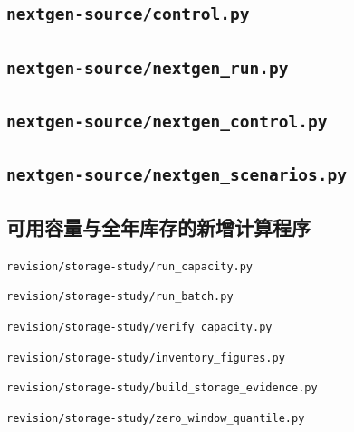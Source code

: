 \subsection*{\texttt{nextgen-source/control.py}}
\subsection*{\texttt{nextgen-source/nextgen\_run.py}}
\subsection*{\texttt{nextgen-source/nextgen\_control.py}}
\subsection*{\texttt{nextgen-source/nextgen\_scenarios.py}}

\subsection*{可用容量与全年库存的新增计算程序}

\noindent\texttt{revision/storage-study/run\_capacity.py}

\noindent\texttt{revision/storage-study/run\_batch.py}

\noindent\texttt{revision/storage-study/verify\_capacity.py}

\noindent\texttt{revision/storage-study/inventory\_figures.py}

\noindent\texttt{revision/storage-study/build\_storage\_evidence.py}

\noindent\texttt{revision/storage-study/zero\_window\_quantile.py}
